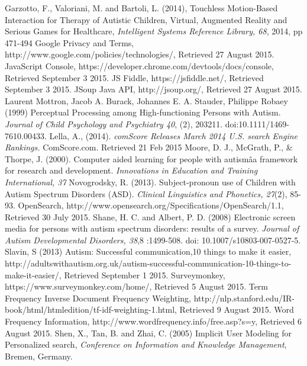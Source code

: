 \documentclass[a4paper, 11pt]{article}
\begin{document}
\begin{thebibliography}{100}
 Garzotto, F., Valoriani, M. and Bartoli, L. (2014), Touchless Motion-Based Interaction for Therapy of Autistic Children, Virtual, Augmented Reality and Serious Games for Healthcare, \textit{Intelligent Systems Reference Library, 68}, 2014, pp 471-494
 Google Privacy and Terms, http://www.google.com/policies/technologies/, Retrieved 27 August 2015.
 JavaScript Console, https://developer.chrome.com/devtools/docs/console, Retrieved September 3 2015.
 JS Fiddle, https://jsfiddle.net/, Retrieved September 3 2015.
 JSoup Java API, http://jsoup.org/, Retrieved 27 August 2015.
Laurent Mottron, Jacob A. Burack, Johannes E. A. Stauder, Philippe Robaey (1999) Perceptual Processing among High-functioning Persons with Autism. \textit{Journal of Child Psychology and Psychiatry 40}, (2), 203211. doi:10.1111/1469-7610.00433.
Lella, A., (2014). \textit{comScore Releases March 2014 U.S. search Engine Rankings.} ComScore.com. Retrieved 21 Feb 2015
Moore, D. J., McGrath, P., \& Thorpe, J. (2000). Computer aided learning for people with autismâa framework for research and development. \textit{Innovations in Education and Training International, 37}
 Novogrodsky, R. (2013). Subject-pronoun use of Children with Autism Spectrum Disorders (ASD). \textit{Clinical Linguistics and Phonetics, 27}(2), 85-93. 
OpenSearch, http://www.opensearch.org/Specifications/OpenSearch/1.1, Retrieved 30 July 2015.
Shane, H. C. and Albert, P. D. (2008) Electronic screen media for persons with autism spectrum disorders: results of a survey. \textit{Journal of Autism Developmental Disorders, 38},8 :1499-508. doi: 10.1007/s10803-007-0527-5.
 Slavin, S (2013) Autism: Successful communication,10 things to make it easier, http://adultswithautism.org.uk/autism-successful-communication-10-things-to-make-it-easier/, Retrieved September 1 2015.
Surveymonkey, https://www.surveymonkey.com/home/, Retrieved 5 August 2015.
 Term Frequency Inverse Document Frequency Weighting, http://nlp.stanford.edu/IR-book/html/htmledition/tf-idf-weighting-1.html, Retrieved 9 August 2015.
 Word Frequency Information, http://www.wordfrequency.info/free.asp?s=y, Retrieved 6 August 2015.
Shen, X., Tan, B. and Zhai, C. (2005) Implicit User Modeling for Personalized search, \textit{Conference on Information and Knowledge Management}, Bremen, Germany.
\end{thebibliography}
\end{document}
